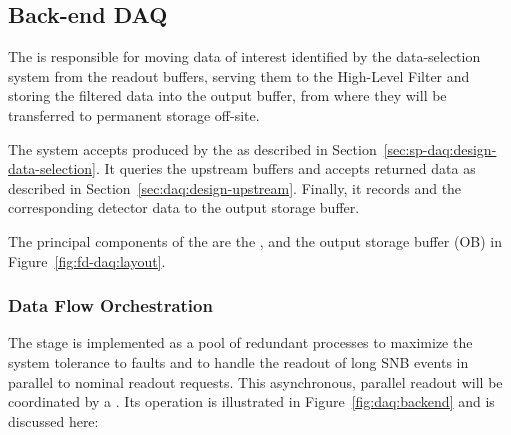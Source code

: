 \subsection{Back-end DAQ}
\label{sec:fd-daq:design-backend}

The   is responsible for moving data of interest identified by the data-selection system from the readout  buffers, serving them to the High-Level Filter and storing the filtered data into the output buffer, from where they will be transferred to permanent storage off-site.

The  system accepts  produced by the  as described
in Section~\ref{sec:sp-daq:design-data-selection}.  It queries the upstream  buffers and
accepts returned data as described in Section~\ref{sec:daq:design-upstream}. Finally, it records
 and the corresponding detector data to the output storage buffer.

The principal components of the  are the ,  and the output
storage buffer (OB) in Figure~\ref{fig:fd-daq:layout}.


\subsubsection{Data Flow Orchestration}

The  stage is implemented as a pool of redundant  processes to maximize the system tolerance to faults and to handle the readout of long SNB events in parallel to nominal readout requests. This asynchronous, parallel readout will be coordinated by a .  Its operation is illustrated in Figure~\ref{fig:daq:backend} and is discussed here:


